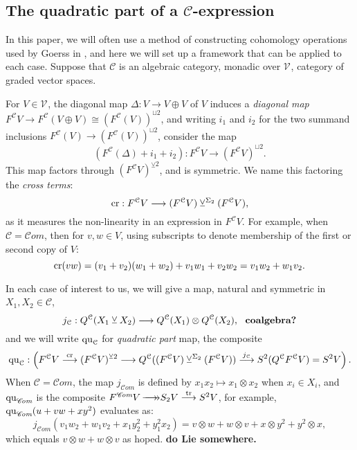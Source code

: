 \documentclass[11pt]{amsart}
\theoremstyle{plain}
\theoremstyle{definition}
\DeclareMathOperator{\trace}{tr}
\renewcommand{\to}{\longrightarrow}
\newcommand{\scrC}{\mathscr{C}}
\newcommand{\calV}{\mathcal{V}}
\newcommand{\calc}{\mathcal{C}}
\theoremstyle{plain}
\newcommand{\vect}[2]{\calV^{#1}_{#2}}
\newcommand{\quadratic}{\textup{qu}}
\newcommand{\crossterms}{\textup{cr}}
\newcommand{\epi}{{\,\makebox[0cm][l]{\ensuremath\to}\to}}
\newcommand{\algs}{{\scrC\!\textit{om}}}
\newcommand{\smashcoprod}{\veebar}%
\begin{document}
\begin{CPiAlgs and CHalgs}
\subsection{The quadratic part of a $\calc$-expression}\label{quadratic part section}
In this paper, we will often use a method of constructing cohomology operations used by Goerss in \cite[\S5]{MR1089001}, and here we will set up a framework that can be applied to each case. Suppose that $\calc$ is an algebraic category, monadic over $\vect{}{}$, category of graded vector spaces. 



For $V\in\vect{}{}$, the diagonal map $\Delta:V\to V\oplus V$ of $V$ induces a \emph{diagonal map} $F^\calc V\to F^\calc (V\oplus V)\cong (F^\calc (V))^{\sqcup 2}$, and writing $i_1$ and $i_2$ for the two summand inclusions $F^\calc (V)\to (F^\calc (V))^{\sqcup 2}$, consider the map
\[(F^\calc(\Delta)+i_1+i_2):F^\calc V\to (F^\calc V)^{\sqcup2}.\]
This map  factors through $(F^\calc V)^{\smashcoprod 2}$, and is symmetric. We name this factoring the \emph{cross terms}:
\[\crossterms:F^\calc V\to (F^\calc V)\smashcoprod^{\Sigma_2} (F^\calc V),\]
as it measures the non-linearity in an expression in $F^\calc V$. For example, when $\calc=\algs$, then for $v,w\in V$, using subscripts to denote membership of the first or second copy of $V$:
\[\crossterms(vw)=(v_1+v_2)(w_1+w_2)+v_1w_1+v_2w_2=v_1w_2+w_1v_2.\]

In each case of interest to us, we will give a map, natural and symmetric in $X_1,X_2\in\calc$,
\[j_\calc:Q^\calc(X_1\smashcoprod X_2)\to Q^\calc(X_1)\otimes Q^\calc(X_2),\ \ \textup{\textbf{coalgebra?}}\]
and we will write $\quadratic_\calc$ for \emph{quadratic part} map, the composite
\[\quadratic_\calc:\left(F^\calc V\overset{\crossterms}{\to}(F^\calc V)^{\smashcoprod 2}\to Q^\calc((F^\calc V)\smashcoprod^{\Sigma_2} (F^\calc V))\overset{j_\calc}{\to}S^2(Q^{\calc}F^\calc V)=S^2V\right).\]
When $\calc=\algs$, the map $j_{\algs}$ is defined by $x_1x_2\mapsto x_1\otimes x_2$ when $x_i\in X_i$, and $\quadratic_{\algs}$ is the composite $F^{\algs} V\epi S_2V\overset{\trace}{\to}S^2V$, for example,  $\quadratic_{\algs}(u+vw+xy^2)$ evaluates as:
\[j_{\algs}(v_1w_2+w_1v_2+x_1y_2^2+y_1^2x_2)=v\otimes w+w\otimes v+x\otimes y^2+y^2\otimes x,\]
which equals $v\otimes w+w\otimes v$ %
as hoped. \textbf{do Lie somewhere.}


\end{CPiAlgs and CHalgs}
\end{document}
